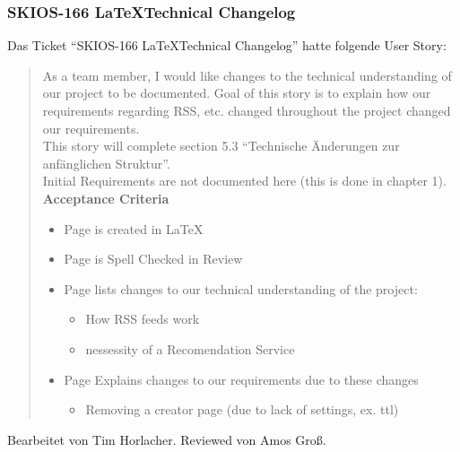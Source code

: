 \subsubsection{SKIOS-166 \LaTeX Technical Changelog}
Das Ticket \enquote{SKIOS-166 \LaTeX Technical Changelog} hatte folgende User Story:
\begin{quotation}
    As a team member, I would like changes to the technical understanding of our project to be documented.
    Goal of this story is to explain how our requirements regarding RSS, etc. changed throughout the project changed our requirements. \\
    This story will complete section 5.3 \enquote{Technische Änderungen zur anfänglichen Struktur}. \\
    Initial Requirements are not documented here (this is done in chapter 1).
\textbf{Acceptance Criteria}
\begin{itemize}
    \item Page is created in LaTeX
    \item Page is Spell Checked in Review
    \item Page lists changes to our technical understanding of the project:
    \begin{itemize}
        \item How RSS feeds work
        \item nessessity of a Recomendation Service
    \end{itemize}
    \item Page Explains changes to our requirements due to these changes
    \begin{itemize}
        \item Removing a creator page (due to lack of settings, ex. ttl)
    \end{itemize}
\end{itemize}
\end{quotation}
Bearbeitet von Tim Horlacher.
Reviewed von Amos Groß.

